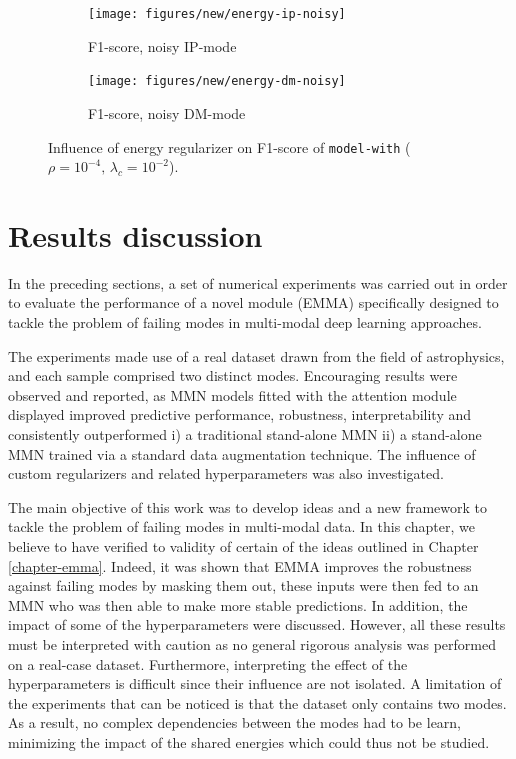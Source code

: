 \begin{figure}[!h]
\centering
\begin{subfigure}{.5\textwidth}
  \centering
  \texttt{[image: figures/new/energy-ip-noisy]}
  \caption{F1-score, noisy IP-mode}
\end{subfigure}%
\begin{subfigure}{.5\textwidth}
  \centering
  \texttt{[image: figures/new/energy-dm-noisy]}
  \caption{F1-score, noisy DM-mode}
\end{subfigure}
\caption[Influence of energy regularization]{Influence of energy regularizer on F1-score of \texttt{model-with} ($\rho=10^{-4},\,\lambda_c=10^{-2}$).}
\label{fig:exp-att-shift-8}
\end{figure}


\section{Results discussion}
In the preceding sections, a set of numerical experiments was carried out in order to evaluate the performance of a novel module (EMMA) specifically designed to tackle the problem of failing modes in multi-modal deep learning approaches.

The experiments made use of a real dataset drawn from the field of astrophysics, and each sample comprised two distinct modes. Encouraging results were observed and reported, as MMN models fitted with the attention module displayed improved predictive performance, robustness, interpretability and consistently outperformed i) a traditional stand-alone MMN ii) a stand-alone MMN trained via a standard data augmentation technique. The influence of custom regularizers and related hyperparameters was also investigated.

The main objective of this work was to develop ideas and a new framework to tackle the problem of failing modes in multi-modal data. In this chapter, we believe to have verified to validity of certain of the ideas outlined in Chapter \ref{chapter-emma}. Indeed, it was shown that EMMA improves the robustness against failing modes by masking them out, these inputs were then fed to an MMN who was then able to make more stable predictions. In addition, the impact of some of the hyperparameters were discussed. However, all these results must be interpreted with caution as no general rigorous analysis was performed on a real-case dataset. Furthermore, interpreting the effect of the hyperparameters is difficult since their influence are not isolated. A limitation of the experiments that can be noticed is that the dataset only contains two modes. As a result, no complex dependencies between the modes had to be learn, minimizing the impact of the shared energies which could thus not be studied. 


